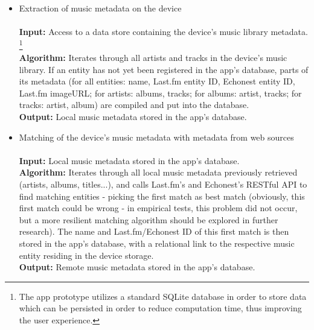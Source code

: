 \begin{itemize}
	\item Extraction of music metadata on the device \\\\
			\textbf{Input:} Access to a data store containing the device's music library metadata. \footnote{The app prototype utilizes a standard SQLite database in order to store data which can be persisted in order to reduce computation time, thus improving the user experience.}
			  \\
			\textbf{Algorithm:} Iterates through all artists and tracks in the device's music library.
			If an entity has not yet been registered in the app's database, parts of its metadata (for all entities: name, Last.fm entity ID, Echonest entity ID, Last.fm imageURL; for artists: albums, tracks; for albums: artist, tracks; for tracks: artist, album) are compiled and put into the database. \\
			\textbf{Output:} Local music metadata stored in the app's database.\\
			
	\item Matching of the device's music metadata with metadata from web sources \\\\
			\textbf{Input:} Local music metadata stored in the app's database.  \\
			\textbf{Algorithm:} Iterates through all local music metadata previously retrieved (artists, albums, titles...), and calls	Last.fm's and Echonest's RESTful API to find matching entities - picking the first match as best match (obviously, this first match could be wrong - in empirical tests, this problem did not occur, but a more resilient matching algorithm should be explored in further research). The name and Last.fm/Echonest ID of this first match is then stored in the app's database, with a relational link to the respective music entity residing in the device storage. \\
			\textbf{Output:} Remote music metadata stored in the app's database. \\
			

\end{itemize}
